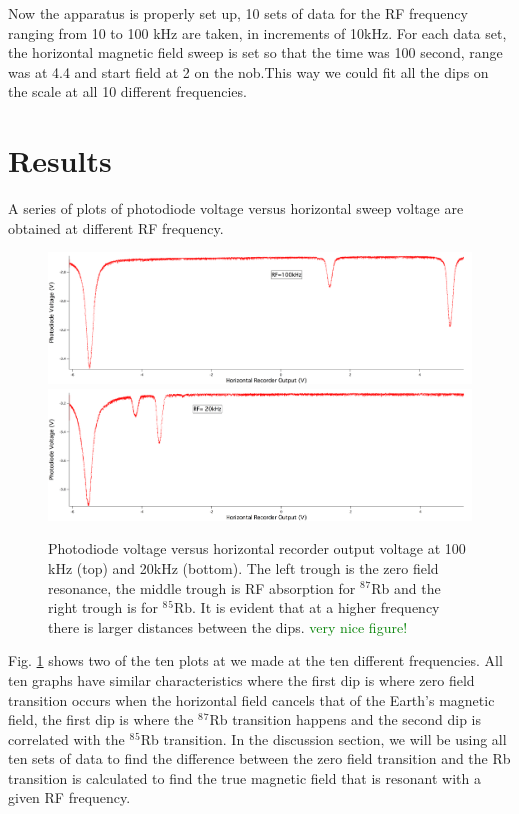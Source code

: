 \documentclass[prb,preprint]{revtex4-1}
\begin{document}
Now the apparatus is properly set up, 10 sets of data for the RF frequency ranging from 10 to 100 kHz are taken, in increments of 10kHz. For each data set, the horizontal magnetic field sweep is set so that the time was 100 second, range was at 4.4 and start field at 2 on the nob.This way we could fit all the dips on the scale at all 10 different frequencies.\\


\section{Results}

A series of plots of photodiode voltage versus horizontal sweep voltage are obtained at different RF frequency. \\

\begin{figure}[h!!!!!!!!]
\centering
\includegraphics[width=15cm]{100k.png}
\includegraphics[width=15cm]{20k.png}
\caption{Photodiode voltage versus horizontal recorder output voltage at 100 kHz (top) and 20kHz (bottom). The left trough is the zero field resonance, the middle trough is RF absorption for $^8$$^7$Rb and the right trough is for $^8$$^5$Rb. It is evident that at a higher frequency there is larger  distances between the dips. \textcolor{green}{very nice figure!}}
\label{100kHz}
\end{figure}


Fig. \ref{100kHz} shows two of the ten plots at we made at the ten different frequencies. All ten graphs have similar characteristics where the first dip is where zero field transition occurs when the horizontal field cancels that of the Earth's magnetic field, the first dip is where the  $^8$$^7$Rb transition happens and the second dip is correlated with the $^8$$^5$Rb transition. In the discussion section, we will be using all ten sets of data to find the difference between the zero field transition and the Rb transition is calculated to find the true magnetic field that is resonant with a given RF frequency.\\
\end{document}
